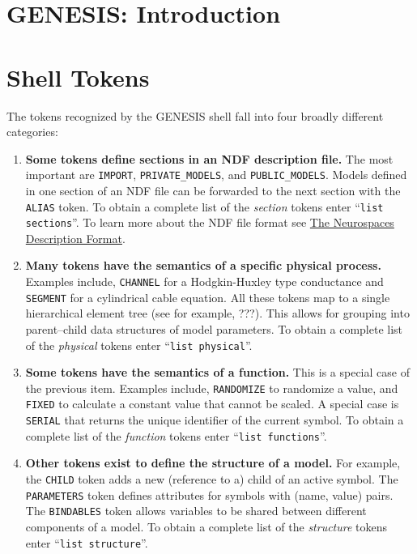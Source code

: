 \documentclass[12pt]{article}
\begin{document}
\section*{GENESIS: Introduction}

\section*{Shell Tokens}

The tokens recognized by the GENESIS shell fall into four broadly different categories:

\begin{enumerate}

\item {\bf Some tokens define sections in an NDF description file.} The most important are {\tt IMPORT}, {\tt PRIVATE\_MODELS}, and {\tt PUBLIC\_MODELS}. Models defined in one section of an NDF file can be forwarded to the next section with the {\tt ALIAS} token. To obtain a complete list of the {\it section} tokens enter ``{\tt list sections}''. To learn more about the NDF file format see \href{../document-ndf-file-format/document-ndf-file-format.pdf}{The Neurospaces Description Format}.

\item {\bf Many tokens have the semantics of a specific physical process.} Examples include, {\tt CHANNEL} for a Hodgkin-Huxley type conductance and {\tt SEGMENT} for a cylindrical cable equation. All these tokens map to a single hierarchical element tree (see for example, ???). This allows for grouping into parent--child data structures of model parameters. To obtain a complete list of the {\it physical} tokens enter ``{\tt list physical}''.

\item {\bf Some tokens have the semantics of a function.} This is a special case of the previous item. Examples include, {\tt RANDOMIZE} to randomize a value, and {\tt FIXED} to calculate a constant value that cannot be scaled. A special case is {\tt SERIAL} that returns the unique identifier  of the current symbol.  To obtain a complete list of the {\it  function} tokens enter ``{\tt list functions}''.

\item {\bf Other tokens exist to define the structure of a model.} For example, the {\tt CHILD} token adds a new (reference to a) child of an active symbol. The {\tt PARAMETERS} token defines attributes for symbols with (name, value) pairs. The {\tt BINDABLES} token allows variables to be shared between different components of a model. To obtain a complete list of the {\it structure} tokens enter ``{\tt list structure}''.

\end{enumerate}
\end{document}
